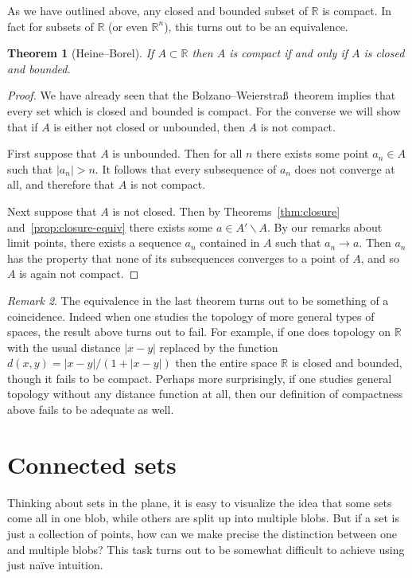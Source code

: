 \documentclass[11pt,oneside]{amsbook}
\newcommand{\RR}{\mathbb R}
\theoremstyle{definition}
\theoremstyle{plain}
\newtheorem{thm}{Theorem}[section]
\theoremstyle{definition}
\theoremstyle{remark}
\newtheorem{rem}[thm]{Remark}
\numberwithin{equation}{section}
\numberwithin{figure}{section}
\begin{document}
As we have outlined above, any closed and bounded subset of $\RR$ is compact. In fact for subsets of $\RR$ (or even $\RR^n$), this turns out to be an equivalence.

\begin{thm}[Heine--Borel]
  If $A\subset\RR$ then $A$ is compact if and only if $A$ is closed and bounded.
\end{thm}

\begin{proof}
  We have already seen that the Bolzano--Weierstra\ss\ theorem implies that every set which is closed and bounded is compact. For the converse we will show that if $A$ is either not closed or unbounded, then $A$ is not compact.

  First suppose that $A$ is unbounded. Then for all $n$ there exists some point $a_n\in A$ such that $|a_n|>n$. It follows that every subsequence of $a_n$ does not converge at all, and therefore that $A$ is not compact.

  Next suppose that $A$ is not closed. Then by Theorems~\ref{thm:closure} and~\ref{prop:closure-equiv} there exists some $a\in A'\smallsetminus A$. By our remarks about limit points, there exists a sequence $a_n$ contained in $A$ such that $a_n\to a$. Then $a_n$ has the property that none of its subsequences converges to a point of $A$, and so $A$ is again not compact.
\end{proof}

\begin{rem}
  The equivalence in the last theorem turns out to be something of a coincidence. Indeed when one studies the topology of more general types of spaces, the result above turns out to fail. For example, if one does topology on $\RR$ with the usual distance $|x-y|$ replaced by the function $d(x,y)=|x-y|/(1+|x-y|)$ then the entire space $\RR$ is closed and bounded, though it fails to be compact. Perhaps more surprisingly, if one studies general topology without any distance function at all, then our definition of compactness above fails to be adequate as well.
\end{rem}

\newpage
\section{Connected sets}

Thinking about sets in the plane, it is easy to visualize the idea that some sets come all in one blob, while others are split up into multiple blobs. But if a set is just a collection of points, how can we make precise the distinction between one and multiple blobs? This task turns out to be somewhat difficult to achieve using just na\"ive intuition.
\end{document}
